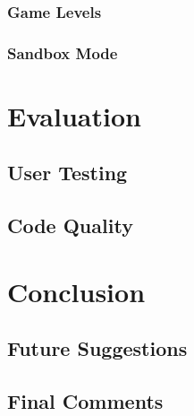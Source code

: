 \documentclass[msc,deptreport, cs]{infthesis}
\begin{document}
\subsection{Game Levels}

\subsection{Sandbox Mode}

\chapter{Evaluation}

\section{User Testing}

\section{Code Quality}

\chapter{Conclusion}

\section{Future Suggestions} 


\section{Final Comments}



\end{document}
